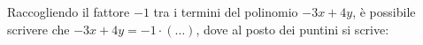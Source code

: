 Raccogliendo il fattore $-1$ tra i termini del polinomio \mbox{$-3x+4y$}, 
è possibile scrivere che $-3x+4y = -1 \cdot (\dots)$,
dove al posto dei puntini si scrive:

